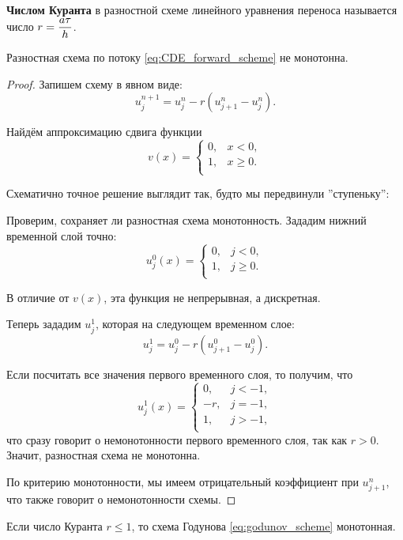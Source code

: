 \documentclass{article}
\begin{document}
\begin{define}\label{eq:courant_number}
	\textbf{Числом Куранта} в разностной схеме линейного уравнения переноса
	называется число $\mathlarger{r=\frac{a\tau}{h}}$.
\end{define}

\begin{lemma}
	Разностная схема по потоку \eqref{eq:CDE_forward_scheme} не монотонна.
\end{lemma}

\begin{proof}\label{eq:CDE_forward_scheme_lemma}
	Запишем схему в явном виде:
	\[u_j^{n+1}=u_j^n-r(u_{j+1}^n-u_j^n).\]

	Найдём аппроксимацию сдвига функции
	\[v(x)=
		\begin{cases}
			0, & x<0, \\
			1, & x\ge 0. \\
		\end{cases}
	\]

	Схематично точное решение выглядит так, будто мы передвинули
	''ступеньку'':

	

	Проверим, сохраняет ли разностная схема монотонность. Зададим нижний
	временной слой точно:
	\[u_j^0(x)=
		\begin{cases}
			0, & j<0, \\
			1, & j\ge 0. \\
		\end{cases}
	\]

	В отличие от $v(x)$, эта функция не непрерывная, а дискретная.

	Теперь зададим $u_j^1$, которая на следующем временном слое:
	\[u_j^1=u_j^0-r(u_{j+1}^0-u_j^0).\]

	Если посчитать все значения первого временного слоя, то получим, что
	\[u_j^1(x)=
		\begin{cases}
			0, & j<-1, \\
			-r,& j=-1, \\
			1, & j>-1, \\
		\end{cases}
	\]
	что сразу говорит о немонотонности первого временного слоя, так как
	$r>0$. Значит, разностная схема не монотонна.

	По критерию монотонности, мы имеем отрицательный коэффициент при
	$u_{j+1}^n$, что также говорит о немонотонности схемы.
\end{proof}

\begin{theorem}\label{eq:courant_condition}
	Если число Куранта $r\le 1$, то схема Годунова
	\eqref{eq:godunov_scheme} монотонная.
\end{theorem}
\end{document}
